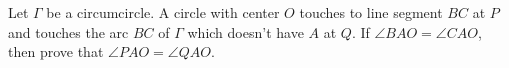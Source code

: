 Let $ \Gamma$ be a circumcircle. A circle with center $ O$ touches to line segment $ BC$ at $ P$ and touches the arc $ BC$ of $ \Gamma$ which doesn't have $ A$ at $ Q$. If $ \angle {BAO} = \angle {CAO}$, then prove that $ \angle {PAO} = \angle {QAO}$.